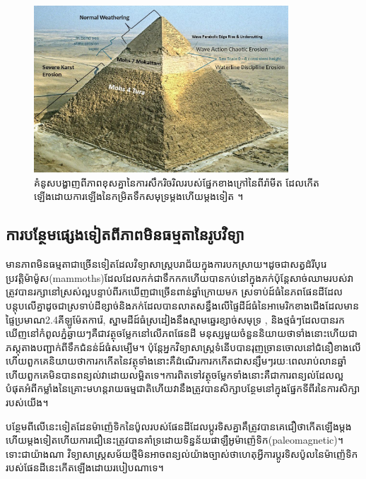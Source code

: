 \documentclass[10pt,twocolumn,letterpaper]{article}
\begin{document}
\begin{figure}[t]
\begin{center}
\includegraphics[width=0.85\textwidth]{khafre.jpg}
\end{center}
   \caption{គំនូសបង្ហាញពីភាពខុសគ្នានៃការសឹករិចរិលរបស់ផ្នែកខាងក្រៅនៃពីរ៉ាមីត ដែលកើតឡើងដោយការឡើងនៃកម្រិតទឹកសមុទ្រម្តងហើយម្តងទៀត \cite{27}។}
\label{fig:4}
\end{figure}

\subsection{ការបន្ថែមផ្សេងទៀតពីភាពមិនធម្មតានៃរូបវិទ្យា}

មានភាពមិនធម្មតាជាច្រើនទៀតដែលវិទ្យាសាស្ត្របរាជ័យក្នុងការបកស្រាយ។​ដូចជាសត្វដំរីបុរេប្រវត្តិម៉ាម៉ូស(mammoths)ដែលដែលកក់ជាទឹកកកហើយបានកប់នៅក្នុងភក់ប៉ុន្តែសាច់ឈាមរបស់វាត្រូវបានរក្សានៅស្រស់ល្អបន្ទាប់ពីរកឃើញជាច្រើនពាន់ឆ្នាំក្រោយមក \cite{17,18,19} ស្រទាប់ដ៍ធំនៃភពផែនដីដែលបន្តុបលើគ្នាដូចជាស្រទាប់ដី​ខ្សាច់​និង​ភក់ដែលបានលាតសន្ធឹងលើផ្ទៃដីដ៍ធំនៃអាមេរិកខាងជើងដែលមានផ្ទៃប្រមាណ2.4គីឡូម៉ែតការ៉េ\cite{21}, ស្នាមដីដ៍ធំស្រដៀងនឹងស្មាមឆ្នេរខ្សាច់សមុទ្រ \cite{22}, និងថ្មធំៗដែលបានរកឃើញនៅកំពូលភ្នំឆ្ងាយៗគឺជាវត្ថុចម្លែកនៅលើភពផែនដី \cite{23,26}​មនុស្សមួយចំនួននិយាយថាទាំងនោះហើយជាភស្តុតាងបញ្ជាក់ពីទឹកជំនន់ដ៍ធំសម្បើម។ ប៉ុន្តែអ្នកវិទ្យាសាស្ត្រទំនើបបានរុញច្រានចោលនៅជំនឿខាងលើ​ហើយពួកគេនិយាយថាការកកើតនៃវត្ថុទាំងនោះគឺដំណើរការកកើតជាសន្សឹមៗរយៈពេលរាប់លានឆ្នាំ​ហើយពួកគេមិនបានពន្យល់វាដោយលម្អិតទេ។​ការពិតទៅវត្ថុចម្លែកទាំងនោះគឺជាការពន្យល់ដែលល្អបំផុតអំពីកម្លាំងនៃគ្រោះមហន្តរាយធម្មជាតិ​ហើយវានឹងត្រូវបានសិក្សាបន្ថែមនៅក្នុងផ្នែកទីពីរនៃការសិក្សារបស់យើង។

បន្ថែមពីលើនេះទៀត​ដែនម៉ាញ៉េទិកនៃប៉ូលរបស់ផែនដីដែលប្តូរទិសគ្នា​គឹត្រូវបានគេជឿថាកើតឡើងម្តងហើយម្តងទៀត​ហើយការជឿនេះត្រូវបានគាំទ្រដោយទិន្នន័យផាឡឺអូម៉ាញ៉េទិក(paleomagnetic)​ \cite{35,40,41}។ ទោះជាយ៉ាងណា វិទ្យាសាស្ត្រសម័យថ្មីមិនអាចពន្យល់យ៉ាងច្បាស់ថាហេតុអ្វីការប្តូរទិសប៉ូលនៃម៉ាញ៉េទិករបស់ផែនដីនេះកើតឡើងដោយរបៀបណាទេ។
\end{document}
